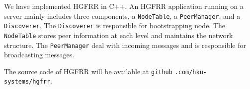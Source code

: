 We have implemented \textsc{HGFRR} in C++. An HGFRR application running on a server mainly includes three components, a \texttt{NodeTable}, a \texttt{PeerManager}, and a \texttt{Discoverer}. The \texttt{Discoverer} is responsible for bootstrapping node. The \texttt{NodeTable} stores peer information at each level and maintains the network structure. The \texttt{PeerManager} deal with incoming messages and is responsible for broadcasting messages.

The source code of HGFRR will be available at \texttt{github} \texttt{.com/hku-systems/hgfrr}.